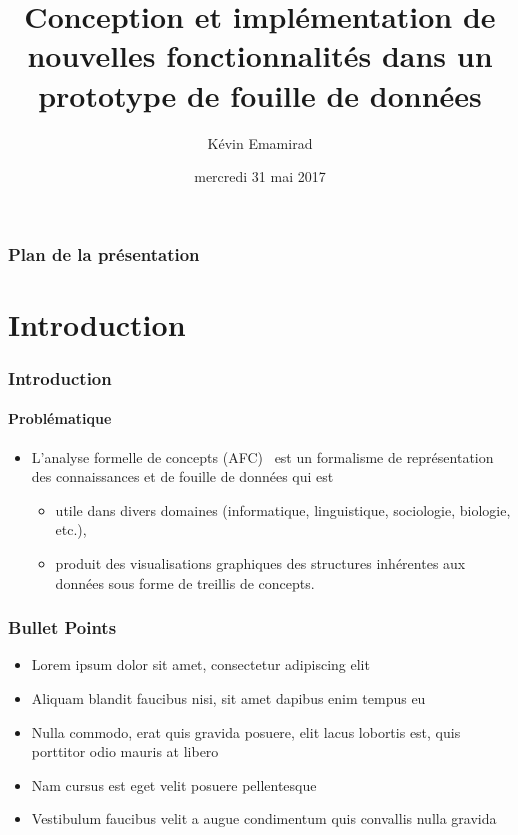 \documentclass[french]{beamer}
\title[Lattice Miner]{Conception et implémentation de nouvelles fonctionnalités dans un prototype de fouille de données} %
\author{Kévin Emamirad} %
\institute[UQO] %
{
Université du Québec en Outaouais \\ %
Département d’informatique et d’ingénierie \\
\medskip
\textit{emak01@uqo.ca} %
}
\date{mercredi 31 mai 2017} %
\begin{document}
\begin{frame}
\titlepage %
\end{frame}

\begin{frame}
\frametitle{Plan de la présentation} %
\tableofcontents %
\end{frame}

\section{Introduction}

\begin{frame}
\frametitle{Introduction}
\framesubtitle{Problématique}
\begin{itemize}
\item L'analyse formelle de concepts (AFC)~\parencite{Ganter1999}
est un formalisme de représentation des connaissances et de fouille de données qui est
\begin{itemize}
\item utile dans divers domaines (informatique, linguistique, sociologie, biologie, etc.),
\item produit des visualisations graphiques des structures inhérentes aux données sous forme de treillis de concepts.
\end{itemize}
\end{itemize}
\end{frame}


\begin{frame}
\frametitle{Bullet Points}
\begin{itemize}
\item Lorem ipsum dolor sit amet, consectetur adipiscing elit
\item Aliquam blandit faucibus nisi, sit amet dapibus enim tempus eu
\item Nulla commodo, erat quis gravida posuere, elit lacus lobortis est, quis porttitor odio mauris at libero
\item Nam cursus est eget velit posuere pellentesque
\item Vestibulum faucibus velit a augue condimentum quis convallis nulla gravida
\end{itemize}
\end{frame}
\end{document}
